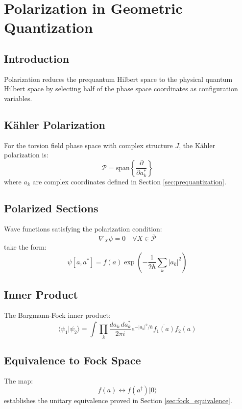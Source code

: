 \section{Polarization in Geometric Quantization}
\label{sec:polarization}

\subsection{Introduction}

Polarization reduces the prequantum Hilbert space to the physical quantum Hilbert space by selecting half of the phase space coordinates as configuration variables.

\subsection{Kähler Polarization}

\begin{definition}
For the torsion field phase space with complex structure $J$, the Kähler polarization is:
\begin{equation}
    \mathcal{P} = \text{span}\left\{ \frac{\partial}{\partial a_k^*} \right\}
\end{equation}
where $a_k$ are complex coordinates defined in Section \ref{sec:prequantization}.
\end{definition}

\subsection{Polarized Sections}

Wave functions satisfying the polarization condition:
\begin{equation}
    \nabla_X \psi = 0 \quad \forall X \in \bar{\mathcal{P}}
\end{equation}
take the form:
\begin{equation}
    \psi[a, a^*] = f(a) \exp\left(-\frac{1}{2\hbar} \sum_k |a_k|^2\right)
\end{equation}

\subsection{Inner Product}

The Bargmann-Fock inner product:
\begin{equation}
    \langle \psi_1 | \psi_2 \rangle = \int \prod_k \frac{da_k \, da_k^*}{2\pi i} e^{-|a_k|^2/\hbar} \overline{f_1(a)} f_2(a)
\end{equation}

\subsection{Equivalence to Fock Space}

The map:
\begin{equation}
    f(a) \longleftrightarrow f(a^\dagger) |0\rangle
\end{equation}
establishes the unitary equivalence proved in Section \ref{sec:fock_equivalence}.
